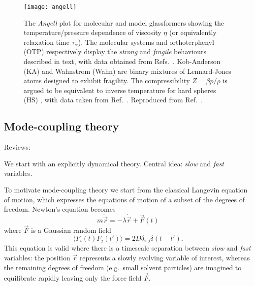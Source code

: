 \begin{SCfigure}
  \texttt{[image: angell]}
  \caption[Angell plot]{
    The \emph{Angell} plot \cite{AngellJNS1988} for molecular and model glassformers showing the temperature/pressure dependence of viscosity $\eta$ (or equivalently relaxation time $\tau_\alpha$).
    The molecular systems  and orthoterphenyl (OTP) respectively display the \emph{strong} and \emph{fragile} behaviours described in text, with data obtained from Refs.\ \cite{AngellS1995, BerthierPRE2009}.
    Kob-Anderson (KA) and Wahnstrom (Wahn) are binary mixtures of Lennard-Jones atoms designed to exhibit fragility.
    The compressibility $Z = \beta p / \rho$ is argued to be equivalent to inverse temperature for hard spheres (HS) \cite{BerthierPRE2009}, with data taken from Ref.\ \cite{RoyallJSM2017}.
    Reproduced from Ref.\ \cite{RoyallPR2015}.
  }
  \label{fig:angell}
\end{SCfigure}



\subsection{Mode-coupling theory}

Reviews: \cite{ReichmanJSM2005, JanssenFP2018}

We start with an explicitly dynamical theory.
Central idea: \emph{slow} and \emph{fast} variables.

To motivate mode-coupling theory we start from the classical Langevin equation of motion, which expresses the equations of motion of a subset of the degrees of freedom.
Newton's equation becomes
\begin{equation*}
  m \ddot{\vec{r}} = - \lambda \dot{\vec{r}} + \vec{F}(t)
\end{equation*}
where $\vec{F}$ is a Gaussian random field
\begin{equation*}
  \langle F_i(t) F_j(t') \rangle = 2 D \delta_{i,j} \delta(t - t').
\end{equation*}
This equation is valid where there is a timescale separation between \emph{slow} and \emph{fast} variables: the position $\vec{r}$ represents a slowly evolving variable of interest, whereas the remaining degrees of freedom (e.g.\ small solvent particles) are imagined to equilibrate rapidly leaving only the force field $\vec{F}$.

